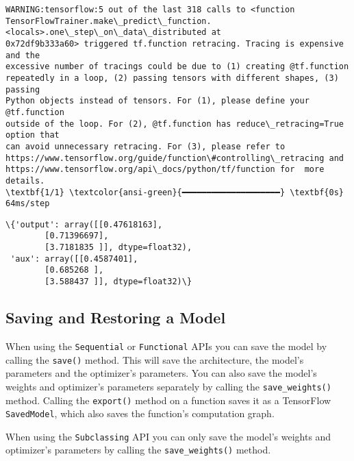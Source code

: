 \documentclass[12pt letter]{report}
\makeatletter
\newcommand{\boxspacing}{\kern\kvtcb@left@rule\kern\kvtcb@boxsep}
\newcommand{\prompt}[4]{
        {\ttfamily\llap{{\color{#2}[#3]:\hspace{3pt}#4}}\vspace{-\baselineskip}}
    }
\makeatother
\begin{document}
    \begin{Verbatim}[commandchars=\\\{\}]
WARNING:tensorflow:5 out of the last 318 calls to <function
TensorFlowTrainer.make\_predict\_function.<locals>.one\_step\_on\_data\_distributed at
0x72df9b333a60> triggered tf.function retracing. Tracing is expensive and the
excessive number of tracings could be due to (1) creating @tf.function
repeatedly in a loop, (2) passing tensors with different shapes, (3) passing
Python objects instead of tensors. For (1), please define your @tf.function
outside of the loop. For (2), @tf.function has reduce\_retracing=True option that
can avoid unnecessary retracing. For (3), please refer to
https://www.tensorflow.org/guide/function\#controlling\_retracing and
https://www.tensorflow.org/api\_docs/python/tf/function for  more details.
\textbf{1/1} \textcolor{ansi-green}{━━━━━━━━━━━━━━━━━━━━} \textbf{0s} 64ms/step
    \end{Verbatim}

            \begin{tcolorbox}[breakable, size=fbox, boxrule=.5pt, pad at break*=1mm, opacityfill=0]
\prompt{Out}{outcolor}{43}{\boxspacing}
\begin{Verbatim}[commandchars=\\\{\}]
\{'output': array([[0.47618163],
        [0.71396697],
        [3.7181835 ]], dtype=float32),
 'aux': array([[0.4587401],
        [0.685268 ],
        [3.588437 ]], dtype=float32)\}
\end{Verbatim}
\end{tcolorbox}
        
\subsection{Saving and Restoring a
Model}\label{saving-and-restoring-a-model}

When using the \texttt{Sequential} or \texttt{Functional} APIs you can
save the model by calling the \texttt{save()} method. This will save the
architecture, the model's parameters and the optimizer's parameters. You
can also save the model's weights and optimizer's parameters separately
by calling the \texttt{save\_weights()} method. Calling the
\texttt{export()} method on a function saves it as a TensorFlow
\texttt{SavedModel}, which also saves the function's computation graph.

When using the \texttt{Subclassing} API you can only save the model's
weights and optimizer's parameters by calling the
\texttt{save\_weights()} method.
\end{document}
